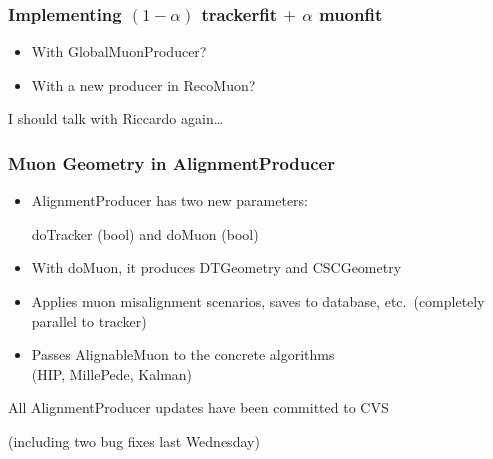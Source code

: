 \documentclass[compress]{beamer}
\begin{document}
\begin{frame}
  \frametitle{Implementing $(1-\alpha)$ trackerfit $+$ $\alpha$ muonfit}

\begin{itemize}
\item With GlobalMuonProducer?
\end{itemize}

\vfill
{}

\vfill
\begin{itemize}
\item With a new producer in RecoMuon?
\end{itemize}

\vfill
I should talk with Riccardo again\ldots
\end{frame}

\begin{frame}
\frametitle{Muon Geometry in AlignmentProducer}
\begin{itemize}\setlength{\itemsep}{0.5 cm}
  \item AlignmentProducer has two new parameters: \begin{center} doTracker (bool) \mbox{\hspace{0.3 cm}} and \mbox{\hspace{0.3 cm}} doMuon (bool) \end{center}
  \item With doMuon, it produces DTGeometry and CSCGeometry
  \item Applies muon misalignment scenarios, saves to database, etc.\ (completely parallel to tracker)
  \item Passes AlignableMuon to the concrete algorithms \\ (HIP, MillePede, Kalman)
\end{itemize}

\vfill
All AlignmentProducer updates have been committed to CVS

\vfill
(including two bug fixes last Wednesday)
\end{frame}
\end{document}
